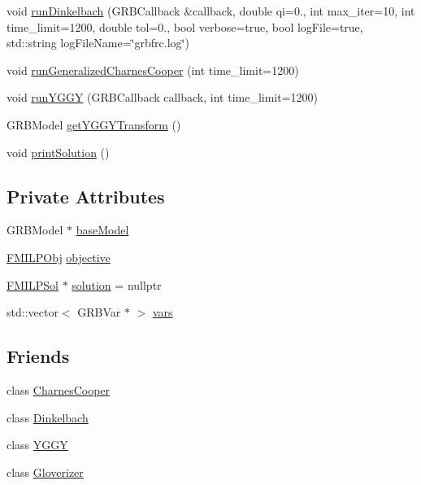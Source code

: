 \begin{DoxyCompactItemize}
\item 
void \hyperlink{classgrbfrc_1_1FMILP_a0eb2e593a68bb8612b7e9483fda428d2}{run\+Dinkelbach} (G\+R\+B\+Callback \&callback, double qi=0., int max\+\_\+iter=10, int time\+\_\+limit=1200, double tol=0., bool verbose=true, bool log\+File=true, std\+::string log\+File\+Name=\char`\"{}grbfrc.\+log\char`\"{})
\item 
void \hyperlink{classgrbfrc_1_1FMILP_a8ee40cf97350d09be062f711c081aa67}{run\+Generalized\+Charnes\+Cooper} (int time\+\_\+limit=1200)
\item 
void \hyperlink{classgrbfrc_1_1FMILP_a76f59c733d36a5d06c8da909be01ad6f}{run\+Y\+G\+GY} (G\+R\+B\+Callback callback, int time\+\_\+limit=1200)
\item 
G\+R\+B\+Model \hyperlink{classgrbfrc_1_1FMILP_a1362b319e977e4063553bdea9cd4ecf1}{get\+Y\+G\+G\+Y\+Transform} ()
\item 
void \hyperlink{classgrbfrc_1_1FMILP_a981a9d57ccb5c0410314be4de6bd0897}{print\+Solution} ()
\end{DoxyCompactItemize}
\subsection*{Private Attributes}
\begin{DoxyCompactItemize}
\item 
G\+R\+B\+Model $\ast$ \hyperlink{classgrbfrc_1_1FMILP_a587e886dcaa1ece325a7f283100182a8}{base\+Model}
\item 
\hyperlink{structgrbfrc_1_1FMILPObj}{F\+M\+I\+L\+P\+Obj} \hyperlink{classgrbfrc_1_1FMILP_a8807cc16614684fd6053b44dcd65657c}{objective}
\item 
\hyperlink{structgrbfrc_1_1FMILPSol}{F\+M\+I\+L\+P\+Sol} $\ast$ \hyperlink{classgrbfrc_1_1FMILP_ae7b20c4efb2d3a689d46a5b88329b207}{solution} = nullptr
\item 
std\+::vector$<$ G\+R\+B\+Var $\ast$ $>$ \hyperlink{classgrbfrc_1_1FMILP_acbf6866651d8b8b18c094302cf2a4284}{vars}
\end{DoxyCompactItemize}
\subsection*{Friends}
\begin{DoxyCompactItemize}
\item 
class \hyperlink{classgrbfrc_1_1FMILP_adf7fb42f9a4a02584da1dcb6469fc521}{Charnes\+Cooper}
\item 
class \hyperlink{classgrbfrc_1_1FMILP_a84e1163273507597523f840b89817919}{Dinkelbach}
\item 
class \hyperlink{classgrbfrc_1_1FMILP_ab4df4b3fe13c29ab1a27a64a8da3f093}{Y\+G\+GY}
\item 
class \hyperlink{classgrbfrc_1_1FMILP_ae46934249303b16d5e90251e221b363e}{Gloverizer}
\end{DoxyCompactItemize}


